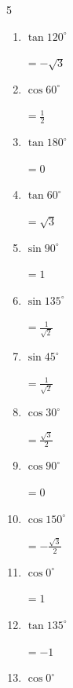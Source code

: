 \begin{multicols}{5}
\begin{enumerate}
        $\displaystyle =-\frac{1}{2}$

  \item $\displaystyle \tan{120^\circ}$

        $\displaystyle =-\sqrt{3}$

  \item $\displaystyle \cos{60^\circ}$

        $\displaystyle =\frac{1}{2}$

  \item $\displaystyle \tan{180^\circ}$

        $\displaystyle =0$

  \item $\displaystyle \tan{60^\circ}$

        $\displaystyle =\sqrt{3}$

  \item $\displaystyle \sin{90^\circ}$

        $\displaystyle =1$

  \item $\displaystyle \sin{135^\circ}$

        $\displaystyle =\frac{1}{\sqrt{2}}$

  \item $\displaystyle \sin{45^\circ}$

        $\displaystyle =\frac{1}{\sqrt{2}}$

\columnbreak %

\resetques

  \item $\displaystyle \cos{30^\circ}$

        $\displaystyle =\frac{\sqrt{3}}{2}$

  \item $\displaystyle \cos{90^\circ}$

        $\displaystyle =0$

  \item $\displaystyle \cos{150^\circ}$

        $\displaystyle =-\frac{\sqrt{3}}{2}$

  \item $\displaystyle \cos{0^\circ}$

        $\displaystyle =1$

  \item $\displaystyle \tan{135^\circ}$

        $\displaystyle =-1$

  \item $\displaystyle \cos{0^\circ}$


\end{enumerate}
\end{multicols}
